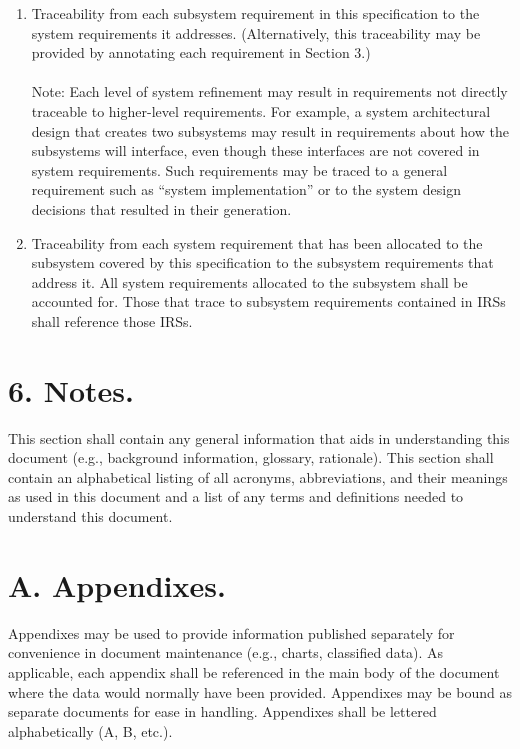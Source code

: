 \begin{enumerate}
\itemsep1pt\parskip0pt
\item
  Traceability from each subsystem requirement in this specification to
  the system requirements it addresses. (Alternatively, this
  traceability may be provided by annotating each requirement in Section
  3.) \\\\ Note: Each level of system refinement may result in
  requirements not directly traceable to higher-level requirements. For
  example, a system architectural design that creates two subsystems may
  result in requirements about how the subsystems will interface, even
  though these interfaces are not covered in system requirements. Such
  requirements may be traced to a general requirement such as ``system
  implementation'' or to the system design decisions that resulted in
  their generation.
\item
  Traceability from each system requirement that has been allocated to
  the subsystem covered by this specification to the subsystem
  requirements that address it. All system requirements allocated to the
  subsystem shall be accounted for. Those that trace to subsystem
  requirements contained in IRSs shall reference those IRSs.
\end{enumerate}

\section{6. Notes.}

This section shall contain any general information that aids in
understanding this document (e.g., background information, glossary,
rationale). This section shall contain an alphabetical listing of all
acronyms, abbreviations, and their meanings as used in this document and
a list of any terms and definitions needed to understand this document.

\section{A. Appendixes.}

Appendixes may be used to provide information published separately for
convenience in document maintenance (e.g., charts, classified data). As
applicable, each appendix shall be referenced in the main body of the
document where the data would normally have been provided. Appendixes
may be bound as separate documents for ease in handling. Appendixes
shall be lettered alphabetically (A, B, etc.).
